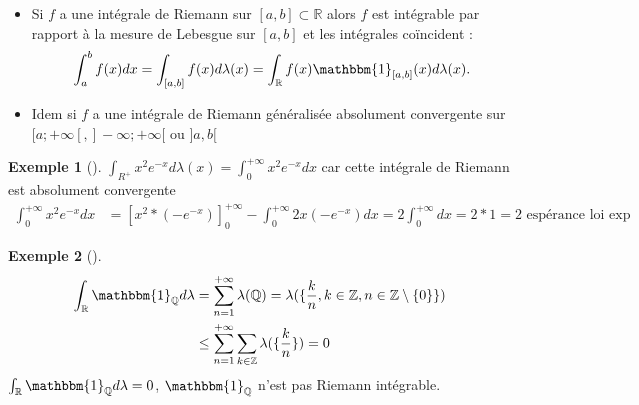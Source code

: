\documentclass{article}
\theoremstyle{plain}%
\theoremstyle{definition}
\newtheorem{exmp}{Exemple}[section]
\theoremstyle{remark}
\begin{document}
    \begin{itemize}
        \item Si $ f $ a une intégrale de Riemann sur $ [a,b] \subset \mathbb{R} $ alors $ f $ est intégrable par rapport à la mesure de Lebesgue sur $ [a,b] $ et les intégrales coïncident : 
        \[
            \int_{a}^{b}f(x)dx = \int_{[a,b]}^{}f(x)d \lambda (x) = \int_{\mathbb{R}}^{}f(x) \mathbbm{1}_{[a,b]}(x)d \lambda (x)
        .\]
        \item Idem si $ f $ a une intégrale de Riemann généralisée absolument convergente sur $ [a; + \infty [, ]-\infty ; + \infty [$ ou $]a,b[ $ 
    \end{itemize}
    \begin{exmp}[]
        $ \int_{R^+}^{}x^2e^{-x}d \lambda (x)= \int_{0}^{+\infty }x^2 e^{-x}dx $ car cette intégrale de Riemann est absolument convergente \begin{align*}
            \int_{0}^{+\infty }x^2 e^{-x}dx &= [x^2 * (-e^{-x})]_0^{+\infty }- \int_{0}^{+\infty } 2x(-e^{-x})dx= 2 \int_{0}^{+ \infty }dx = 2*1 = 2 \text{ espérance loi exp}
        \end{align*}
    \end{exmp}
    \begin{exmp}[]
        \begin{align*}
            \int_{\mathbb{R}}^{}\mathbbm{1}_{\mathbb{Q}}d \lambda &= \sum_{n=1}^{+\infty } \lambda (\mathbb{Q}) = \lambda (\{ \frac{k}{n}, k \in \mathbb{Z}, n \in \mathbb{Z}\setminus \{0\} \}) \\
            & \leq \sum_{n=1}^{+\infty }\sum_{k \in \mathbb{Z}}^{}\lambda ( \{\frac{k}{n}\}) = 0
        \end{align*}
        $ \int_{\mathbb{R}}^{}\mathbbm{1}_{\mathbb{Q}}d \lambda = 0 $, $ \mathbbm{1}_{\mathbb{Q}} $ n'est pas Riemann intégrable.
    \end{exmp}
    
\end{document}
